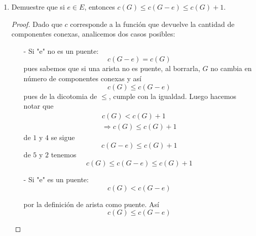 \documentclass{article}
\begin{document}
\begin{enumerate}
\item Demuestre que si $e \in E$, entonces $c(G) \le c(G-e) \le c(G) + 1$.
  
  \renewcommand\qedsymbol{QED}
  \begin{proof}
    Dado que $c$ corresponde a la función que devuelve la cantidad de componentes
    conexas, analicemos dos casos posibles:
    
    \begin{itemize}
    \item[-] Si "e" no es un puente:
      \begin{equation}
        c(G -e) = c(G)
      \end{equation}
      pues sabemos que si una arista no es puente, al borrarla, $G$ no cambia en
      número de componentes conexas y así
      \begin{equation}
        c(G) \leq c(G -e)
      \end{equation}
      pues de la dicotomia de $\leq$, cumple con la igualdad. Luego hacemos notar que
      \begin{eqnarray}
        c(G) < c(G) +1\\
        \Rightarrow c(G) \leq c(G) +1
      \end{eqnarray}
      de $1$ y $4$ se sigue
      \begin{equation}
        c(G -e) \leq c(G) +1
      \end{equation}
      de $5$ y $2$ tenemos
      \[
      c(G) \le c(G-e) \le c(G) + 1
      \]            
      
    \item[-] Si "e" es un puente:
      \begin{equation}
        c(G) < c(G -e)
      \end{equation}

      por la definición de arista como puente. Así
      \begin{equation}
        c(G) \leq c(G -e)
      \end{equation}


\end{itemize}
\end{proof}
\end{enumerate}
\end{document}
